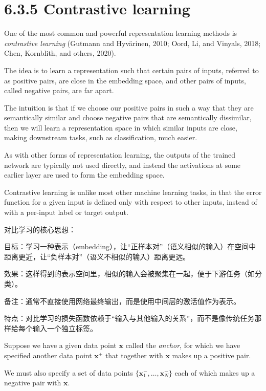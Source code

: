 \documentclass{article}
\begin{document}
\section{6.3.5 Contrastive learning}

One of the most common and powerful representation learning methods is \emph{contrastive learning} (Gutmann and Hyv\"arinen, 2010; Oord, Li, and Vinyals, 2018; Chen, Kornblith, and others, 2020). 

The idea is to learn a representation such that certain pairs of inputs, referred to as positive pairs, are close in the embedding space, and other pairs of inputs, called negative pairs, are far apart. 

The intuition is that if we choose our positive pairs in such a way that they are semantically similar and choose negative pairs that are semantically dissimilar, then we will learn a representation space in which similar inputs are close, making downstream tasks, such as classification, much easier. 

As with other forms of representation learning, the outputs of the trained network are typically not used directly, and instead the activations at some earlier layer are used to form the embedding space. 

Contrastive learning is unlike most other machine learning tasks, in that the error function for a given input is defined only with respect to other inputs, instead of with a per-input label or target output.

{\color{red}
对比学习的核心思想：

目标：学习一种表示（embedding），让“正样本对”（语义相似的输入）在空间中距离更近，让“负样本对”（语义不相似的输入）距离更远。

效果：这样得到的表示空间里，相似的输入会被聚集在一起，便于下游任务（如分类）。

备注：通常不直接使用网络最终输出，而是使用中间层的激活值作为表示。

特点：对比学习的损失函数依赖于“输入与其他输入的关系”，而不是像传统任务那样给每个输入一个独立标签。
}

Suppose we have a given data point $\mathbf{x}$ called the \emph{anchor}, for which we have specified another data point $\mathbf{x}^+$ that together with $\mathbf{x}$ makes up a positive pair. 

We must also specify a set of data points $\{\mathbf{x}_1^-, \dots, \mathbf{x}_N^-\}$ each of which makes up a negative pair with $\mathbf{x}$. 
\end{document}
